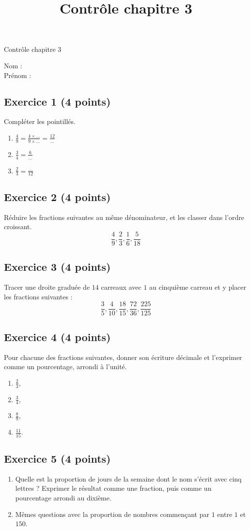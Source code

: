 \documentclass[14 pt]{extarticle}
\title{Contrôle chapitre 3}
\date{}
\theoremstyle{plain}
\begin{document}
\begin{center}{\Large Contrôle chapitre 3}\\ 
 \end{center}
 Nom : \\
 Prénom : 
 \subsection*{Exercice 1 (4 points)}
 
Compléter les pointillés.
\begin{enumerate}
\item $\frac49=\frac{4\times \ldots}{9\times \ldots} = \frac{12}\ldots$
\item $\frac34=\frac6\ldots$
\item $\frac23=\frac{\ldots}{12}$
\end{enumerate}

\subsection*{Exercice 2 (4 points)}
Réduire les fractions suivantes au même dénominateur, et les classer dans l'ordre croissant. 
\[ \frac49, \frac23, \frac16, \frac5{18}\]
\subsection*{Exercice 3 (4 points)}

Tracer une droite graduée de $14$ carreaux avec $1$ au cinquième carreau et y placer les fractions suivantes : 
\[ \frac35, \frac4{10}, \frac{18}{15}, \frac{72}{36}, \frac{225}{125}\]

\subsection*{Exercice 4 (4 points)}

Pour chacune des fractions suivantes, donner son écriture décimale et l'exprimer comme un pourcentage, arrondi à l'unité. 
\begin{enumerate}
\item $\frac23$,
\item $\frac34$,
\item $\frac89$,
\item $\frac{11}{15}$. 
\end{enumerate}

\subsection*{Exercice 5 (4 points)}
\begin{enumerate}
\item Quelle est la proportion de jours de la semaine dont le nom s'écrit avec cinq lettres ? Exprimer le résultat comme une fraction, puis comme un pourcentage arrondi au dixième. 
\item Mêmes questions avec la proportion de nombres commençant par $1$ entre $1$ et $150$. \end{enumerate}

 	
\end{document}
